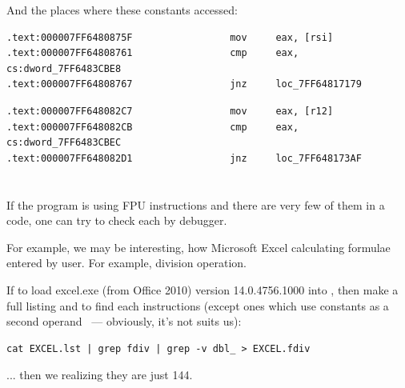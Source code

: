 {And the places where these constants accessed:}

\begin{lstlisting}
.text:000007FF6480875F                 mov     eax, [rsi]
.text:000007FF64808761                 cmp     eax, cs:dword_7FF6483CBE8
.text:000007FF64808767                 jnz     loc_7FF64817179
\end{lstlisting}


\begin{lstlisting}
.text:000007FF648082C7                 mov     eax, [r12]
.text:000007FF648082CB                 cmp     eax, cs:dword_7FF6483CBEC
.text:000007FF648082D1                 jnz     loc_7FF648173AF
\end{lstlisting}

\section{}

{If the program is using FPU instructions and there are very few of them in a code,
one can try to check each by debugger.}

{For example, we may be interesting, how Microsoft Excel calculating formulae entered by user.
For example, division operation.}

{If to load excel.exe (from Office 2010) version 14.0.4756.1000 into \IDA, then make a full listing
and to find each \FDIV instructions (except ones which use constants as a second 
operand ~--- obviously, it's not suits us):}

\begin{lstlisting}
cat EXCEL.lst | grep fdiv | grep -v dbl_ > EXCEL.fdiv
\end{lstlisting}

{... then we realizing they are just 144.}

